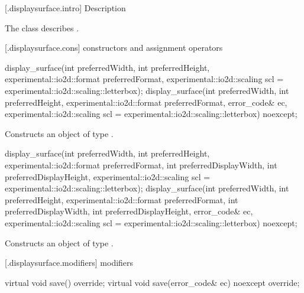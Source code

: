  [\iotwod.displaysurface.intro] { Description}

\pnum
{}
The class  describes .

 [\iotwod.displaysurface.cons] { constructors and assignment operators}

\begin{itemdecl}
display_surface(int preferredWidth, int preferredHeight, 
  experimental::io2d::format preferredFormat,
  experimental::io2d::scaling scl = experimental::io2d::scaling::letterbox);
display_surface(int preferredWidth, int preferredHeight, 
  experimental::io2d::format preferredFormat, error_code& ec,
  experimental::io2d::scaling scl = experimental::io2d::scaling::letterbox)
  noexcept;
\end{itemdecl}
\begin{itemdescr}
	\pnum
	\effects
	Constructs an object of type .
	
	\pnum
	\postconditions
\end{itemdescr}

\begin{itemdecl}
display_surface(int preferredWidth, int preferredHeight, 
  experimental::io2d::format preferredFormat,
  int preferredDisplayWidth, int preferredDisplayHeight,
  experimental::io2d::scaling scl = experimental::io2d::scaling::letterbox);
display_surface(int preferredWidth, int preferredHeight, 
  experimental::io2d::format preferredFormat,
  int preferredDisplayWidth, int preferredDisplayHeight, error_code& ec,
  experimental::io2d::scaling scl = experimental::io2d::scaling::letterbox) 
  noexcept;
\end{itemdecl}
\begin{itemdescr}
	\pnum
	\effects
	Constructs an object of type .
	
	\pnum
	\postconditions
\end{itemdescr}

 [\iotwod.displaysurface.modifiers]{ modifiers}

\begin{itemdecl}
    virtual void save() override;
    virtual void save(error_code& ec) noexcept override;
\end{itemdecl}
\begin{itemdescr}
	\pnum
	\effects
	
	\pnum
	\postconditions
	
\end{itemdescr}

